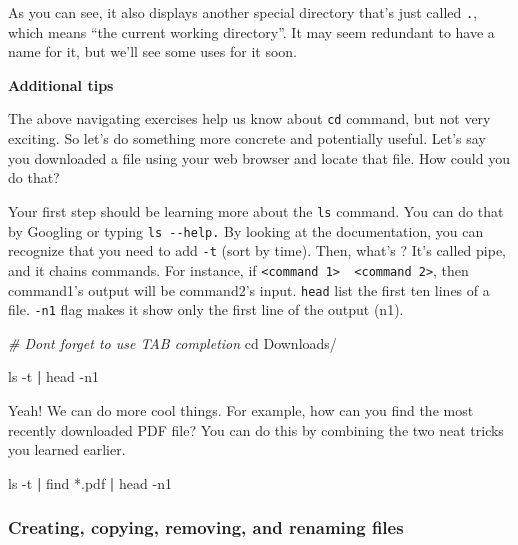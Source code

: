 \documentclass[
]{book}
\newenvironment{Shaded}{\begin{snugshade}}{\end{snugshade}}
\newcommand{\BuiltInTok}[1]{#1}
\newcommand{\CommentTok}[1]{\textcolor[rgb]{0.56,0.35,0.01}{\textit{#1}}}
\newcommand{\FunctionTok}[1]{\textcolor[rgb]{0.00,0.00,0.00}{#1}}
\newcommand{\KeywordTok}[1]{\textcolor[rgb]{0.13,0.29,0.53}{\textbf{#1}}}
\newcommand{\NormalTok}[1]{#1}
\begin{document}
As you can see, it also displays another special directory that's just called \texttt{.}, which means ``the current working directory''. It may seem redundant to have a name for it, but we'll see some uses for it soon.

\textbf{Additional tips}

The above navigating exercises help us know about \texttt{cd} command, but not very exciting. So let's do something more concrete and potentially useful. Let's say you downloaded a file using your web browser and locate that file. How could you do that?

Your first step should be learning more about the \texttt{ls} command. You can do that by Googling or typing \texttt{ls\ -\/-help.} By looking at the documentation, you can recognize that you need to add \texttt{-t} (sort by time). Then, what's \texttt{\textbar{}}? It's called pipe, and it chains commands. For instance, if \texttt{\textless{}command\ 1\textgreater{}\ \textbar{}\ \textless{}command\ 2\textgreater{}}, then command1's output will be command2's input. \texttt{head} list the first ten lines of a file. \texttt{-n1} flag makes it show only the first line of the output (n1).

\begin{Shaded}
\begin{Highlighting}[]
\CommentTok{\# Don\textquotesingle{}t forget to use TAB completion}
\BuiltInTok{cd}\NormalTok{ Downloads/ }

\FunctionTok{ls}\NormalTok{ {-}t }\KeywordTok{|} \FunctionTok{head}\NormalTok{ {-}n1}
\end{Highlighting}
\end{Shaded}

Yeah! We can do more cool things. For example, how can you find the most recently downloaded PDF file? You can do this by combining the two neat tricks you learned earlier.

\begin{Shaded}
\begin{Highlighting}[]
\FunctionTok{ls}\NormalTok{ {-}t }\KeywordTok{|} \FunctionTok{find}\NormalTok{ *.pdf }\KeywordTok{|} \FunctionTok{head}\NormalTok{ {-}n1 }
\end{Highlighting}
\end{Shaded}

\hypertarget{creating-copying-removing-and-renaming-files}{%
\subsubsection{Creating, copying, removing, and renaming files}\label{creating-copying-removing-and-renaming-files}}
\end{document}

